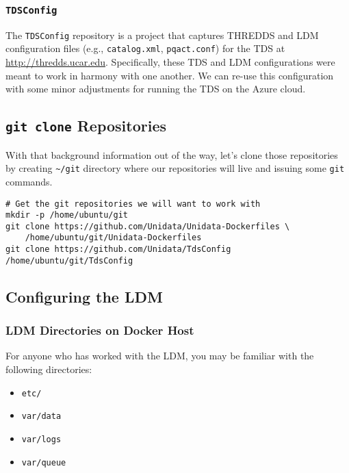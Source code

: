 \documentclass[11pt]{article}
\begin{document}
\subsubsection{\texttt{TDSConfig}}
\label{sec:orgheadline13}

The \texttt{TDSConfig} repository is a project that captures THREDDS and LDM configuration files (e.g., \texttt{catalog.xml}, \texttt{pqact.conf}) for the TDS at \url{http://thredds.ucar.edu}. Specifically, these TDS and LDM configurations were meant to work in harmony with one another. We can re-use this configuration with some minor adjustments for running the TDS on the Azure cloud.

\subsection{\texttt{git clone} Repositories}
\label{sec:orgheadline15}

With that background information out of the way, let's clone those repositories by creating \texttt{\textasciitilde{}/git} directory where our repositories will live and issuing some \texttt{git} commands.

\begin{verbatim}
# Get the git repositories we will want to work with
mkdir -p /home/ubuntu/git
git clone https://github.com/Unidata/Unidata-Dockerfiles \
    /home/ubuntu/git/Unidata-Dockerfiles
git clone https://github.com/Unidata/TdsConfig /home/ubuntu/git/TdsConfig
\end{verbatim}

\subsection{Configuring the LDM}
\label{sec:orgheadline24}
\subsubsection{LDM Directories on Docker Host}
\label{sec:orgheadline16}

For anyone who has worked with the LDM, you may be familiar with the following directories:


\begin{itemize}
\item \texttt{etc/}
\item \texttt{var/data}
\item \texttt{var/logs}
\item \texttt{var/queue}
\end{itemize}
\end{document}
